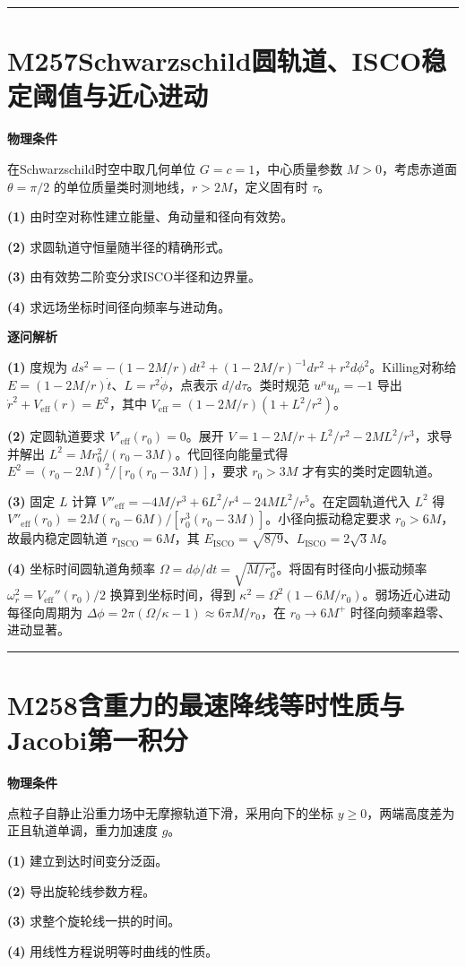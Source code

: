 \documentclass[UTF8,a4paper,11pt,oneside,openany]{ctexbook}
\begin{document}
\par\bigskip\hrule\bigskip
\section*{M257\quad Schwarzschild圆轨道、ISCO稳定阈值与近心进动}
\textbf{物理条件}\par 在Schwarzschild时空中取几何单位 \(G=c=1\)，中心质量参数 \(M>0\)，考虑赤道面 \(\theta=\pi/2\) 的单位质量类时测地线，\(r>2M\)，定义固有时 \(\tau\)。
\par\noindent\textbf{(1)} 由时空对称性建立能量、角动量和径向有效势。
\par\noindent\textbf{(2)} 求圆轨道守恒量随半径的精确形式。
\par\noindent\textbf{(3)} 由有效势二阶变分求ISCO半径和边界量。
\par\noindent\textbf{(4)} 求远场坐标时间径向频率与进动角。

\par\medskip\noindent\textbf{逐问解析}
\par\noindent\textbf{(1)} 度规为 \(ds^2=-(1-2M/r)dt^2+(1-2M/r)^{-1}dr^2+r^2d\phi^2\)。Killing对称给 \(E=(1-2M/r)\dot t\)、\(L=r^2\dot\phi\)，点表示 \(d/d\tau\)。类时规范 \(u^\mu u_\mu=-1\) 导出 \(\dot r^2+V_{\mathrm{eff}}(r)=E^2\)，其中 \(V_{\mathrm{eff}}=(1-2M/r)(1+L^2/r^2)\)。
\par\noindent\textbf{(2)} 定圆轨道要求 \(V'_{\mathrm{eff}}(r_0)=0\)。展开 \(V=1-2M/r+L^2/r^2-2ML^2/r^3\)，求导并解出 \(L^2=Mr_0^2/(r_0-3M)\)。代回径向能量式得 \(E^2=(r_0-2M)^2/[r_0(r_0-3M)]\)，要求 \(r_0>3M\) 才有实的类时定圆轨道。
\par\noindent\textbf{(3)} 固定 \(L\) 计算 \(V''_{\mathrm{eff}}=-4M/r^3+6L^2/r^4-24ML^2/r^5\)。在定圆轨道代入 \(L^2\) 得 \(V''_{\mathrm{eff}}(r_0)=2M(r_0-6M)/[r_0^3(r_0-3M)]\)。小径向振动稳定要求 \(r_0>6M\)，故最内稳定圆轨道 \(r_{\mathrm{ISCO}}=6M\)，其 \(E_{\mathrm{ISCO}}=\sqrt{8/9}\)、\(L_{\mathrm{ISCO}}=2\sqrt3M\)。
\par\noindent\textbf{(4)} 坐标时间圆轨道角频率 \(\Omega=d\phi/dt=\sqrt{M/r_0^3}\)。将固有时径向小振动频率 \(\omega_r^2=V_{\mathrm{eff}}''(r_0)/2\) 换算到坐标时间，得到 \(\kappa^2=\Omega^2(1-6M/r_0)\)。弱场近心进动每径向周期为 \(\Delta\phi=2\pi(\Omega/\kappa-1)\approx6\pi M/r_0\)，在 \(r_0\to6M^+\) 时径向频率趋零、进动显著。

\par\bigskip\hrule\bigskip
\section*{M258\quad 含重力的最速降线等时性质与Jacobi第一积分}
\textbf{物理条件}\par 点粒子自静止沿重力场中无摩擦轨道下滑，采用向下的坐标 \(y\ge0\)，两端高度差为正且轨道单调，重力加速度 \(g\)。
\par\noindent\textbf{(1)} 建立到达时间变分泛函。
\par\noindent\textbf{(2)} 导出旋轮线参数方程。
\par\noindent\textbf{(3)} 求整个旋轮线一拱的时间。
\par\noindent\textbf{(4)} 用线性方程说明等时曲线的性质。
\end{document}
